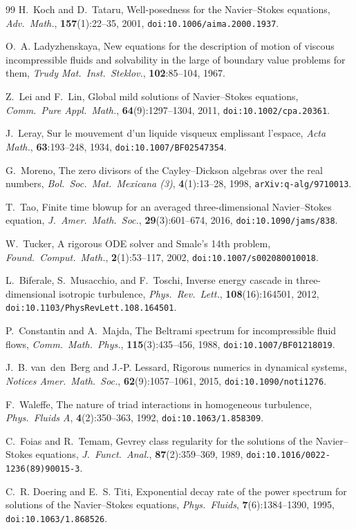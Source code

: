 \documentclass[11pt]{article}
\theoremstyle{plain}
\theoremstyle{definition}
\begin{document}
\begin{thebibliography}{99}
H.~Koch and D.~Tataru,
Well-posedness for the Navier--Stokes equations,
\emph{Adv.\ Math.}, \textbf{157}(1):22--35, 2001, \texttt{doi:10.1006/aima.2000.1937}.

O.~A. Ladyzhenskaya,
New equations for the description of motion of viscous incompressible fluids and solvability in the large of boundary value problems for them,
\emph{Trudy Mat.\ Inst.\ Steklov.}, \textbf{102}:85--104, 1967.

Z.~Lei and F.~Lin,
Global mild solutions of Navier--Stokes equations,
\emph{Comm.\ Pure Appl.\ Math.}, \textbf{64}(9):1297--1304, 2011, \texttt{doi:10.1002/cpa.20361}.

J.~Leray,
Sur le mouvement d'un liquide visqueux emplissant l'espace,
\emph{Acta Math.}, \textbf{63}:193--248, 1934, \texttt{doi:10.1007/BF02547354}.

G.~Moreno,
The zero divisors of the Cayley--Dickson algebras over the real numbers,
\emph{Bol.\ Soc.\ Mat.\ Mexicana (3)}, \textbf{4}(1):13--28, 1998, \texttt{arXiv:q-alg/9710013}.

T.~Tao,
Finite time blowup for an averaged three-dimensional Navier--Stokes equation,
\emph{J.\ Amer.\ Math.\ Soc.}, \textbf{29}(3):601--674, 2016, \texttt{doi:10.1090/jams/838}.

W.~Tucker,
A rigorous ODE solver and Smale's 14th problem,
\emph{Found.\ Comput.\ Math.}, \textbf{2}(1):53--117, 2002, \texttt{doi:10.1007/s002080010018}.

L.~Biferale, S.~Musacchio, and F.~Toschi,
Inverse energy cascade in three-dimensional isotropic turbulence,
\emph{Phys.\ Rev.\ Lett.}, \textbf{108}(16):164501, 2012, \texttt{doi:10.1103/PhysRevLett.108.164501}.

P.~Constantin and A.~Majda,
The Beltrami spectrum for incompressible fluid flows,
\emph{Comm.\ Math.\ Phys.}, \textbf{115}(3):435--456, 1988, \texttt{doi:10.1007/BF01218019}.

J.~B. van~den~Berg and J.-P. Lessard,
Rigorous numerics in dynamical systems,
\emph{Notices Amer.\ Math.\ Soc.}, \textbf{62}(9):1057--1061, 2015, \texttt{doi:10.1090/noti1276}.

F.~Waleffe,
The nature of triad interactions in homogeneous turbulence,
\emph{Phys.\ Fluids A}, \textbf{4}(2):350--363, 1992, \texttt{doi:10.1063/1.858309}.

C.~Foias and R.~Temam,
Gevrey class regularity for the solutions of the Navier--Stokes equations,
\emph{J.\ Funct.\ Anal.}, \textbf{87}(2):359--369, 1989, \texttt{doi:10.1016/0022-1236(89)90015-3}.

C.~R. Doering and E.~S. Titi,
Exponential decay rate of the power spectrum for solutions of the Navier--Stokes equations,
\emph{Phys.\ Fluids}, \textbf{7}(6):1384--1390, 1995, \texttt{doi:10.1063/1.868526}.

\end{thebibliography}
\end{document}
